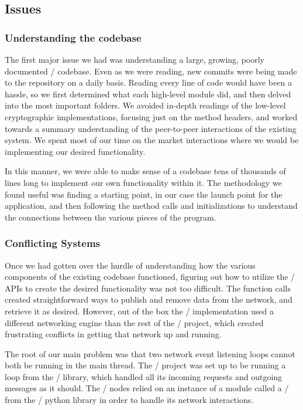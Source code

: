 \documentclass[11pt,twocolumn]{article}
\begin{document}
\subsection{Issues}

\subsubsection{Understanding the codebase}
The first major issue we had was understanding a large, growing, poorly documented \OpenBazaar/ codebase.
Even as we were reading, new commits were being made to the repository on a daily basis.
Reading every line of code would have been a hassle, so we first determined what each high-level module did, and then delved into the most important folders.
We avoided in-depth readings of the low-level cryptographic implementations, focusing just on the method headers, and worked towards a summary understanding of the peer-to-peer interactions of the existing system.
We spent most of our time on the market interactions where we would be implementing our desired functionality.

In this manner, we were able to make sense of a codebase tens of thousands of lines long to implement our own functionality within it.
The methodology we found useful was finding a starting point, in our case the launch point for the application, and then following the method calls and initializations to understand the connections between the various pieces of the program.

\subsubsection{Conflicting Systems}
Once we had gotten over the hurdle of understanding how the various components of the existing codebase functioned, figuring out how to utilize the \Entangled/ APIs to create the desired functionality was not too difficult.
The function calls created straightforward ways to publish and remove data from the network, and retrieve it as desired.
However, out of the box the \Entangled/ implementation used a different networking engine than the rest of the \OpenBazaar/ project, which created frustrating conflicts in getting that network up and running.

The root of our main problem was that two network event listening loops cannot both be running in the main thread.
The \OpenBazaar/ project was set up to be running a loop from the \Tornado/ library, which handled all its incoming requests and outgoing messages as it should.
The \Entangled/ nodes relied on an instance of a module called a \reactor/ from the \Twisted/ python library in order to handle its network interactions.
\end{document}
